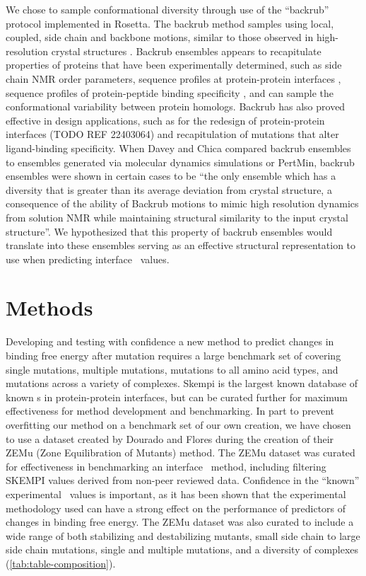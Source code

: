 We chose to sample conformational diversity through use of the ``backrub'' protocol implemented in Rosetta.
The backrub method samples using local, coupled, side chain and backbone motions, similar to those observed in high-resolution crystal structures \cite{davis_backrub_2006}.
Backrub ensembles appears to recapitulate properties of proteins that have been experimentally determined, such as side chain NMR order parameters\cite{friedland_simple_2008}, sequence profiles at protein-protein interfaces \cite{humphris_prediction_2008}, sequence profiles of protein-peptide binding specificity \cite{smith_structure-based_2010,smith_predicting_2011}, and can sample the conformational variability between protein homologs\cite{schenkelberg_protein_2016}.
Backrub has also proved effective in design applications, such as for the redesign of protein-protein interfaces (TODO REF 22403064) and recapitulation of mutations that alter ligand-binding specificity\cite{ollikainen_coupling_2015}.
When Davey and Chica compared backrub ensembles to ensembles generated via molecular dynamics simulations or PertMin, backrub ensembles were shown in certain cases to be
``the only ensemble which has a diversity that is greater than its average deviation from crystal structure, a consequence of the ability of Backrub motions to mimic high resolution dynamics from solution NMR while maintaining structural similarity to the input crystal structure''.\cite{davey_improving_2014}
We hypothesized that this property of backrub ensembles would translate into these ensembles serving as an effective structural representation to use when predicting interface \ddg\ values.

\section{Methods}

Developing and testing with confidence a new method to predict changes in binding free energy after mutation requires a large benchmark set of covering single mutations, multiple mutations, mutations to all amino acid types, and mutations across a variety of complexes.
Skempi \cite{moal_skempi:_2012} is the largest known database of known \ddg s in protein-protein interfaces, but can be curated further for maximum effectiveness for method development and benchmarking.
In part to prevent overfitting our method on a benchmark set of our own creation, we have chosen to use a dataset created by Dourado and Flores\cite{dourado_multiscale_2014} during the creation of their ZEMu (Zone Equilibration of Mutants) method.
The ZEMu dataset was curated for effectiveness in benchmarking an interface \ddg\ method, including filtering SKEMPI values derived from non-peer reviewed data.
Confidence in the ``known'' experimental \ddg\ values is important, as it has been shown that the experimental methodology used can have a strong effect on the performance of predictors of changes in binding free energy\cite{geng_exploring_2016}.
The ZEMu dataset was also curated to include a wide range of both stabilizing and destabilizing mutants, small side chain to large side chain mutations, single and multiple mutations, and a diversity of complexes (\cref{tab:table-composition}).


